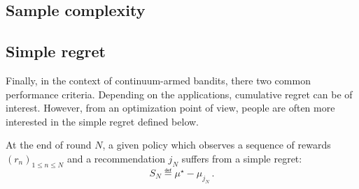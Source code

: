\subsection{Sample complexity}\label{sec:mab.performance.sample}

\subsection{Simple regret}\label{sec:mab.performance.simple}

Finally, in the context of continuum-armed bandits, there two common performance criteria. Depending on the applications, cumulative regret can be of interest. However, from an optimization point of view, people are often more interested in the \gls{simple regret} defined below. 

\begin{definition}\label{def:stoch_mab.simple_regret}
\begin{leftbar}[defnbar]
	At the end of round $N$, a given policy which observes a sequence of rewards $(r_n)_{1 \leq n \leq N}$ and a recommendation $j_N$ suffers from a simple regret:
	\[
		S_N \eqdef \mu^{\star} - \mu_{j_N}\,.
	\]
\end{leftbar}
\end{definition}